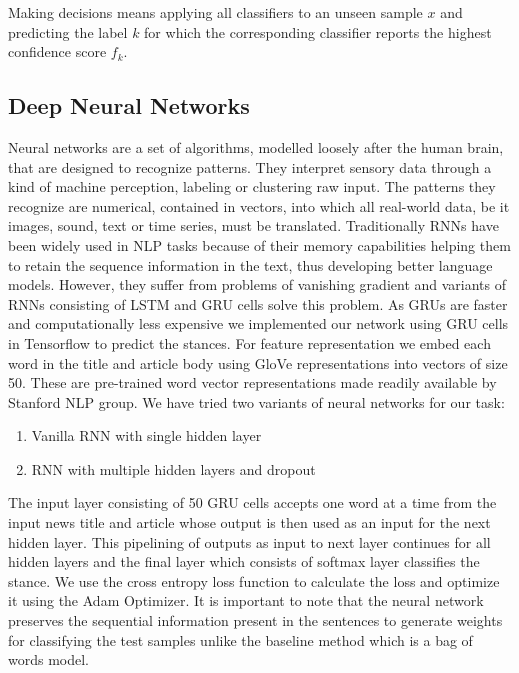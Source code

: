 \documentclass[11.5pt]{article}
\begin{document}
Making decisions means applying all classifiers to an unseen sample $x$ and predicting the label $k$ for which 
the corresponding classifier reports the highest confidence score $f_k$.
 
\subsection{Deep Neural Networks}

Neural networks are a set of algorithms, modelled loosely after the human brain, that are designed to recognize patterns. They interpret sensory data through a kind of machine perception, labeling or clustering raw input. The patterns they recognize are numerical, contained in vectors, into which all real-world data, be it images, sound, text or time series, must be translated. 
Traditionally RNNs have been widely used in NLP tasks because of their memory capabilities helping them to retain the sequence information in the text, thus developing better language models. However, they suffer from problems of vanishing gradient and variants of RNNs consisting of LSTM and GRU cells solve this problem. As GRUs are faster and computationally less expensive we implemented our network using GRU cells in Tensorflow to predict the stances. For feature representation we embed each word in the title and article body using GloVe representations into vectors of size 50. These are pre-trained word vector representations made readily available by Stanford NLP group. We have tried two variants of neural networks for our task:

\begin{enumerate}
  \item Vanilla RNN with single hidden layer   
  \item RNN with multiple hidden layers and dropout  
\end{enumerate}

The input layer consisting of 50 GRU cells accepts one word at a time from the input news 
title and article whose output is then used as an input for the next hidden layer. 
This pipelining of outputs as input to next layer continues for all hidden layers and 
the final layer which consists of softmax layer classifies the stance. 
We use the cross entropy loss function to calculate the loss and optimize it using the Adam Optimizer.
 It is important to note that the neural network preserves the sequential information present in the sentences 
to generate weights for classifying the test samples unlike the baseline method which is a bag of words model. 
\end{document}
